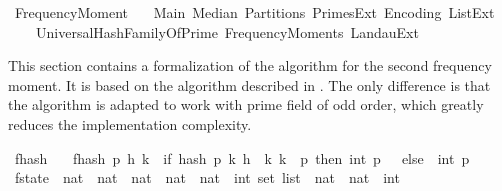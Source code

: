 %
\begin{isabellebody}%
%
%
\isadelimdocument
%
\endisadelimdocument
%
\isatagdocument
%
\isamarkuptrue%
%
\endisatagdocument
{\isafolddocument}%
%
\isadelimdocument
%
\endisadelimdocument
%
\isadelimtheory
%
\endisadelimtheory
%
\isatagtheory
{}\isamarkupfalse%
\ Frequency{\isacharunderscore}{\kern0pt}Moment{\isacharunderscore}{\kern0pt}{}\isanewline
\ \ \ Main\ Median\ Partitions\ Primes{\isacharunderscore}{\kern0pt}Ext\ Encoding\ List{\isacharunderscore}{\kern0pt}Ext\ \isanewline
\ \ \ \ UniversalHashFamilyOfPrime\ Frequency{\isacharunderscore}{\kern0pt}Moments\ Landau{\isacharunderscore}{\kern0pt}Ext\isanewline
{}%
\endisatagtheory
{\isafoldtheory}%
%
\isadelimtheory
%
\endisadelimtheory
%
\begin{isamarkuptext}%
This section contains a formalization of the algorithm for the second frequency moment.
It is based on the algorithm described in \cite[]{alon1999}.
The only difference is that the algorithm is adapted to work with prime field of odd order, which
greatly reduces the implementation complexity.%
\end{isamarkuptext}\isamarkuptrue%
\isamarkupfalse%
\ f{}{\isacharunderscore}{\kern0pt}hash\ \isanewline
\ \ {\isachardoublequoteopen}f{}{\isacharunderscore}{\kern0pt}hash\ p\ h\ k\ {\isacharequal}{\kern0pt}\ {\isacharparenleft}{\kern0pt}if\ hash\ p\ k\ h\ {\isasymin}\ {\isacharbraceleft}{\kern0pt}k{\isachardot}{\kern0pt}\ {}{\isacharasterisk}{\kern0pt}k\ {\isacharless}{\kern0pt}\ p{\isacharbraceright}{\kern0pt}\ then\ int\ p\ {\isacharminus}{\kern0pt}\ {}\ else\ {\isacharminus}{\kern0pt}\ int\ p\ {\isacharminus}{\kern0pt}\ {}{\isacharparenright}{\kern0pt}{\isachardoublequoteclose}\isanewline
\isanewline
{}\isamarkupfalse%
\ f{}{\isacharunderscore}{\kern0pt}state\ {\isacharequal}{\kern0pt}\ {\isachardoublequoteopen}nat\ {\isasymtimes}\ nat\ {\isasymtimes}\ nat\ {\isasymtimes}\ {\isacharparenleft}{\kern0pt}nat\ {\isasymtimes}\ nat\ {\isasymRightarrow}\ int\ set\ list{\isacharparenright}{\kern0pt}\ {\isasymtimes}\ {\isacharparenleft}{\kern0pt}nat\ {\isasymtimes}\ nat\ {\isasymRightarrow}\ int{\isacharparenright}{\kern0pt}{\isachardoublequoteclose}\isanewline

\end{isabellebody}
